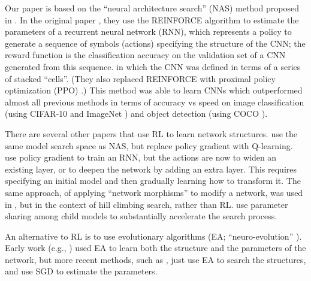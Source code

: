 \documentclass[runningheads]{llncs}
\newcommand{\NAS}{NAS}
\newcommand{\NASRL}{\NAS}
\newcommand{\NAScell}{\NAS}
\begin{document}
Our paper is based on the ``neural architecture search'' (NAS) method proposed in
\cite{DBLP:journals/corr/ZophL16,DBLP:journals/corr/ZophVSL17}.
In the original paper  \cite{DBLP:journals/corr/ZophL16},
they
use the REINFORCE algorithm \cite{Williams92} to estimate the parameters of a
recurrent neural network (RNN),
which represents a policy to generate a sequence of symbols (actions) specifying the structure of the CNN; the reward function is the classification accuracy on the validation set of a CNN generated from this sequence.
in which the CNN was defined in terms of a series of stacked ``cells''.
(They also replaced  REINFORCE with 
proximal policy optimization (PPO) \cite{PPO}.)
This method was able to learn CNNs which outperformed almost all previous methods
in terms of accuracy vs speed on image classification (using
CIFAR-10 \cite{krizhevsky2009learning} and ImageNet \cite{DBLP:conf/cvpr/DengDSLL009})
and object detection (using COCO \cite{DBLP:conf/eccv/LinMBHPRDZ14}).

There are several other papers that use RL to learn network structures.
\cite{Zhong2018}  use the same model search space as \NAScell,  but replace policy gradient with Q-learning.
\cite{Cai2017} use policy gradient to train an RNN, but the actions are now to widen an existing layer, or to deepen the network by adding an extra layer. This requires specifying an initial model and then gradually learning how to transform it.
The same approach, of applying ``network morphisms'' to modify a network,
was used in 
\cite{Elsken2017}, but in the context of hill climbing search, rather than RL.
\cite{ENAS} use parameter sharing among child models to substantially accelerate the search process.


An alternative  to RL is to use evolutionary algorithms (EA; ``neuro-evolution'' \cite{Stanley2017}).
Early work
(e.g., \cite{Stanley2002})
used EA to learn both the structure and the parameters of the network,
but more recent methods,
such as \cite{DBLP:conf/icml/RealMSSSTLK17,Miikkulainen2017,DBLP:journals/corr/XieY17,Liu2017,DBLP:journals/corr/abs-1802-01548},
just use EA to search the structures, and use SGD to estimate the parameters.
\end{document}
